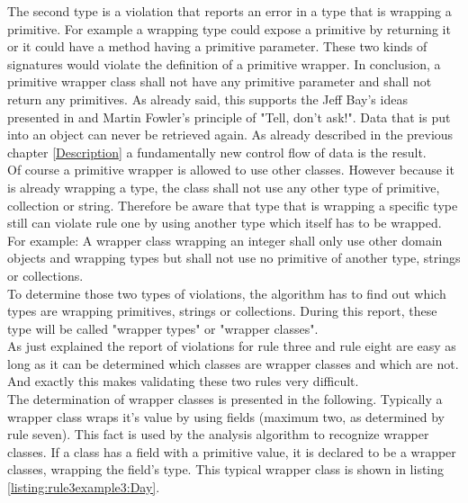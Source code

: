 The second type is a violation that reports an error in a type that is wrapping a primitive. For example a wrapping type could expose a primitive by returning it or it could have a method having a primitive parameter. These two kinds of signatures would violate the definition of a primitive wrapper. In conclusion, a primitive wrapper class shall not have any primitive parameter and shall not return any primitives. As already said, this supports the Jeff Bay's ideas presented in \cite{oc2008} and Martin Fowler's principle of "Tell, don't ask!"\cite{telldontaskoriginal}. Data that is put into an object can never be retrieved again. As already described in the previous chapter \ref{Description} a fundamentally new control flow of data is the result.
\\

Of course a primitive wrapper is allowed to use other classes. However because it is already wrapping a type, the class shall not use any other type of primitive, collection or string. Therefore be aware that type that is wrapping a specific type still can violate rule one by using another type which itself has to be wrapped. For example: A wrapper class wrapping an integer shall only use other domain objects and wrapping types but shall not use no primitive of another type, strings or collections. 
\\

To determine those two types of violations, the algorithm has to find out which types are wrapping primitives, strings or collections. During this report, these type will be called "wrapper types" or "wrapper classes". 
\\

As just explained the report of violations for rule three and rule eight are easy as long as it can be determined which classes are wrapper classes and which are not. And exactly this makes validating these two rules very difficult. 
\\

The determination of wrapper classes is presented in the following. Typically a wrapper class wraps it's value by using fields (maximum two, as determined by rule seven). This fact is used by the analysis algorithm to recognize wrapper classes. If a class has a field with a primitive value, it is declared to be a wrapper classes, wrapping the field's type. This typical wrapper class is shown in listing \ref{listing:rule3example3:Day}. 
\\


